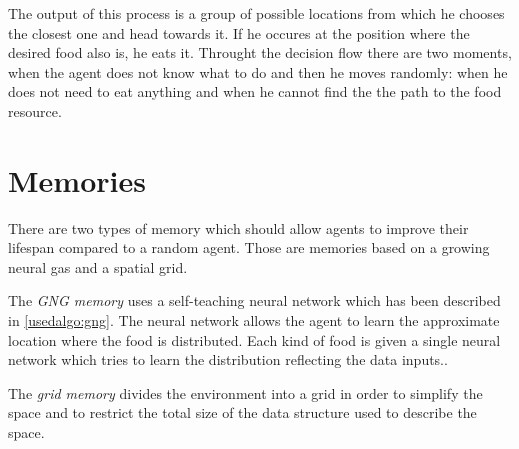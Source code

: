 The output of this process is a group of possible locations from which he chooses the closest one and head towards it. If he occures at the position where the desired food also is, he eats it. Throught the decision flow there are two moments, when the agent does not know what to do and then he moves randomly: when he does not need to eat anything and when he cannot find the the path to the food resource.

\section{Memories}

There are two types of memory which should allow agents to improve their lifespan compared to a random agent. Those are memories based on a growing neural gas and a spatial grid.     

The \emph{GNG memory} uses a self-teaching neural network which has been described in \ref{usedalgo:gng}. The neural network allows the agent to learn the approximate location where the food is distributed. Each kind of food is given a single neural network which tries to learn the distribution reflecting the data inputs..

The \emph{grid memory} divides the environment into a grid in order to simplify the space and to restrict the total size of the data structure used to describe the space.





